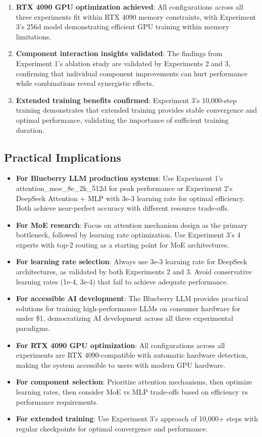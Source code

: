 \documentclass[11pt,a4paper]{article}
\begin{document}
\begin{enumerate}
    \item \textbf{RTX 4090 GPU optimization achieved}: All configurations across all three experiments fit within RTX 4090 memory constraints, with Experiment 3's 256d model demonstrating efficient GPU training within memory limitations.
    
    \item \textbf{Component interaction insights validated}: The findings from Experiment 1's ablation study are validated by Experiments 2 and 3, confirming that individual component improvements can hurt performance while combinations reveal synergistic effects.
    
    \item \textbf{Extended training benefits confirmed}: Experiment 3's 10,000-step training demonstrates that extended training provides stable convergence and optimal performance, validating the importance of sufficient training duration.
\end{enumerate}

\subsection{Practical Implications}

\begin{itemize}
    \item \textbf{For Blueberry LLM production systems}: Use Experiment 1's attention\_moe\_8e\_2k\_512d for peak performance or Experiment 2's DeepSeek Attention + MLP with 3e-3 learning rate for optimal efficiency. Both achieve near-perfect accuracy with different resource trade-offs.
    \item \textbf{For MoE research}: Focus on attention mechanism design as the primary bottleneck, followed by learning rate optimization. Use Experiment 3's 4 experts with top-2 routing as a starting point for MoE architectures.
    \item \textbf{For learning rate selection}: Always use 3e-3 learning rate for DeepSeek architectures, as validated by both Experiments 2 and 3. Avoid conservative learning rates (1e-4, 3e-4) that fail to achieve adequate performance.
    \item \textbf{For accessible AI development}: The Blueberry LLM provides practical solutions for training high-performance LLMs on consumer hardware for under \$1, democratizing AI development across all three experimental paradigms.
    \item \textbf{For RTX 4090 GPU optimization}: All configurations across all experiments are RTX 4090-compatible with automatic hardware detection, making the system accessible to users with modern GPU hardware.
    \item \textbf{For component selection}: Prioritize attention mechanisms, then optimize learning rates, then consider MoE vs MLP trade-offs based on efficiency vs performance requirements.
    \item \textbf{For extended training}: Use Experiment 3's approach of 10,000+ steps with regular checkpoints for optimal convergence and performance.
\end{itemize}
\end{document}
